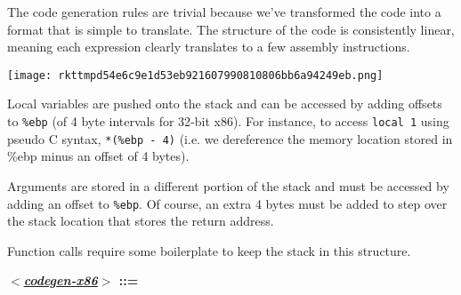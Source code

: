 \documentclass{book}
\newcommand{\Scribtexttt}[1]{{\texttt{#1}}}
\newcommand{\plainlink}[1]{#1}
\begin{document}
The code generation rules are trivial because we{'}ve transformed the code
into a format that is simple to translate. The structure of the code is
consistently linear, meaning each expression clearly translates to a few
assembly instructions.

\texttt{[image: rkttmpd54e6c9e1d53eb921607990810806bb6a94249eb.png]}

Local variables are pushed onto the stack and can be accessed by adding
offsets to \Scribtexttt{\%ebp} (of 4 byte intervals for 32{-}bit x86). For instance,
to access \Scribtexttt{local 1} using pseudo C syntax, \Scribtexttt{*(\%ebp {-} 4)} (i.e. we
dereference the memory location stored in \%ebp minus an offset of
4 bytes).

Arguments are stored in a different portion of the stack and must be
accessed by adding an offset to \Scribtexttt{\%ebp}. Of course, an extra 4 bytes
must be added to step over the stack location that stores the return
address.

Function calls require some boilerplate to keep the stack in this
structure.

\label{t:x28elem_x28chunk_x22x3ccodegenx2dx86x3ex3a1x22x29x29}\textbf{\textit{\hyperref[t:x28elem_x28chunk_x22x3ccodegenx2dx86x3ex3a1x22x29x29]{\plainlink{$<$codegen{-}x86$>$}}} ::=}
\end{document}
